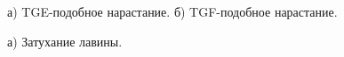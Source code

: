 \begin{figure}[t]
    \begin{center}
        \begin{minipage}[h]{0.49\linewidth}
        \end{minipage}
        \hfill
        \begin{minipage}[h]{0.49\linewidth}
        \end{minipage}
        \caption{а) TGE-подобное нарастание. б) TGF-подобное нарастание.}
    \end{center}
    \label{thunder:rl_1}
\end{figure}


\begin{figure}[t]
    \begin{center}
        \begin{minipage}[h]{0.49\linewidth}
        \end{minipage}
        \hfill
        \begin{minipage}[h]{0.49\linewidth}
        \end{minipage}
        \caption{а) Затухание лавины.}
    \end{center}
    \label{thunder:rl_2}
\end{figure}

